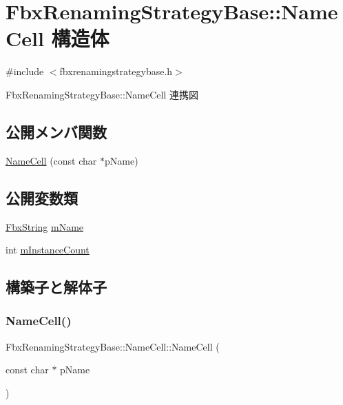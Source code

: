 \hypertarget{struct_fbx_renaming_strategy_base_1_1_name_cell}{}\section{Fbx\+Renaming\+Strategy\+Base\+:\+:Name\+Cell 構造体}
\label{struct_fbx_renaming_strategy_base_1_1_name_cell}


{\ttfamily \#include $<$fbxrenamingstrategybase.\+h$>$}



Fbx\+Renaming\+Strategy\+Base\+:\+:Name\+Cell 連携図
\subsection*{公開メンバ関数}
\begin{DoxyCompactItemize}
\item 
\hyperlink{struct_fbx_renaming_strategy_base_1_1_name_cell_a8f929f28be67eb8316d406207be8c869}{Name\+Cell} (const char $\ast$p\+Name)
\end{DoxyCompactItemize}
\subsection*{公開変数類}
\begin{DoxyCompactItemize}
\item 
\hyperlink{class_fbx_string}{Fbx\+String} \hyperlink{struct_fbx_renaming_strategy_base_1_1_name_cell_ac58a51c6b6e8b2bcd2f0fe2e34fdd83e}{m\+Name}
\item 
int \hyperlink{struct_fbx_renaming_strategy_base_1_1_name_cell_a5f9f539c454fbc1a08e90b59618016b7}{m\+Instance\+Count}
\end{DoxyCompactItemize}


\subsection{構築子と解体子}
\mbox{\label{struct_fbx_renaming_strategy_base_1_1_name_cell_a8f929f28be67eb8316d406207be8c869}} 
\subsubsection{\texorpdfstring{Name\+Cell()}{NameCell()}}
{\footnotesize\ttfamily Fbx\+Renaming\+Strategy\+Base\+::\+Name\+Cell\+::\+Name\+Cell (\begin{DoxyParamCaption}\item[{const char $\ast$}]{p\+Name }\end{DoxyParamCaption})}



